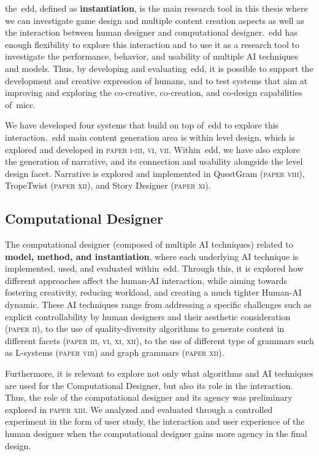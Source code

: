 the~\acrlong{edd}, defined as \textbf{instantiation}, is the main research tool in this thesis where we can investigate game design and multiple content creation aspects as well as the interaction between human designer and computational designer.~\acrshort{edd} has enough flexibility to explore this interaction and to use it as a research tool to investigate the performance, behavior, and usability of multiple AI techniques and models. Thus, by developing and evaluating~\acrshort{edd}, it is possible to support the development and creative expression of humans, and to test systems that aim at improving and exploring the co-creative, co-creation, and co-design capabilities of~\acrshort{micc}.

We have developed four systems that build on top of~\acrshort{edd} to explore this interaction.~\acrshort{edd} main content generation area is within level design, which is explored and developed in \textsc{paper i-iii, vi, vii}. Within~\acrshort{edd}, we have also explore the generation of narrative, and its connection and usability alongside the level design facet. Narrative is explored and implemented in QuestGram (\textsc{paper viii}), TropeTwist (\textsc{paper xii}), and Story Designer (\textsc{paper xi}).


\subsection{Computational Designer}

The computational designer (composed of multiple AI techniques) related to \textbf{model, method, and instantiation}, where each underlying AI technique is implemented, used, and evaluated within~\acrshort{edd}. Through this, it is explored how different approaches affect the human-AI interaction, while aiming towards fostering creativity, reducing workload, and creating a much tighter Human-AI dynamic. These AI techniques range from addressing a specific challenges such as explicit controllability by human designers and their aesthetic consideration (\textsc{paper ii}), to the use of quality-diversity algorithms to generate content in different facets (\textsc{paper iii, vi, xi, xii}), to the use of different type of grammars such as L-systems (\textsc{paper viii}) and graph grammars (\textsc{paper xii}).

Furthermore, it is relevant to explore not only what algorithms and AI techniques are used for the Computational Designer, but also its role in the interaction. Thus, the role of the computational designer and its agency was preliminary explored in \textsc{paper xiii}. We analyzed and evaluated through a controlled experiment in the form of user study, the interaction and user experience of the human designer when the computational designer gains more agency in the final design. 

